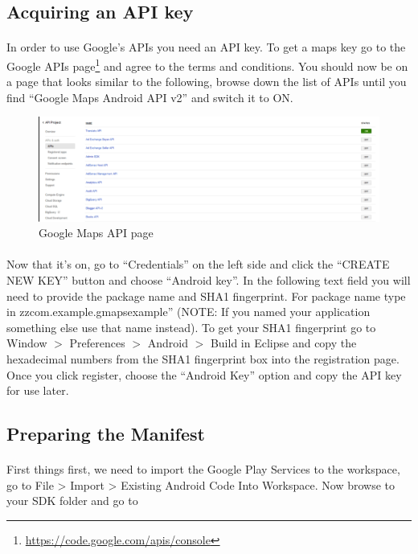 \subsection{Acquiring an API key}
\paragraph{} In order to use Google’s APIs you need an API key.  To get a maps key go to the Google APIs page\footnote{\url{https://code.google.com/apis/console}} and agree to the terms and conditions. You should now be on a page that looks similar to the following, browse down the list of APIs until you find “Google Maps Android API v2” and switch it to ON.

\begin{figure}[H]%
\centering
\includegraphics[width=\textwidth]{images/google-maps-api-page}
\caption{Google Maps API page}
\label{fig:google-maps-api-page}
\end{figure}

\paragraph{} Now that it’s on, go to ``Credentials'' on the left side and click the ``CREATE NEW KEY'' button and choose ``Android key''.  In the following text field you will need to provide the package name and SHA1 fingerprint. For package name type in zzcom.example.gmapsexample'' (NOTE: If you named your application something else use that name instead). To get your SHA1 fingerprint go to Window $>$ Preferences $>$ Android $>$ Build in Eclipse and copy the hexadecimal numbers from the SHA1 fingerprint box into the registration page. Once you click register, choose the “Android Key” option and copy the API key for use later.

\subsection{Preparing the Manifest}
\paragraph{} First things first, we need to import the Google Play Services to the workspace, go to File > Import > Existing Android Code Into Workspace.  Now browse to your SDK folder and go to 

